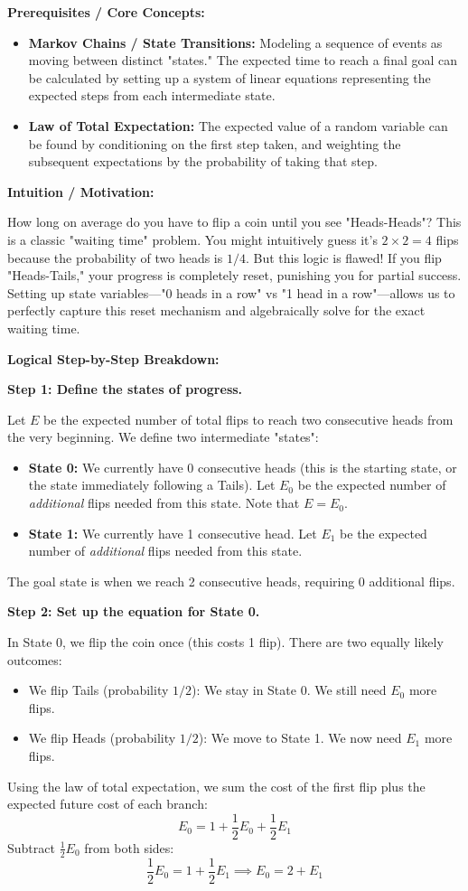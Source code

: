 \begin{solution}
\textbf{Prerequisites / Core Concepts:}
\begin{itemize}
    \item \textbf{Markov Chains / State Transitions:} Modeling a sequence of events as moving between distinct "states." The expected time to reach a final goal can be calculated by setting up a system of linear equations representing the expected steps from each intermediate state.
    \item \textbf{Law of Total Expectation:} The expected value of a random variable can be found by conditioning on the first step taken, and weighting the subsequent expectations by the probability of taking that step.
\end{itemize}

\textbf{Intuition / Motivation:}

How long on average do you have to flip a coin until you see "Heads-Heads"? This is a classic "waiting time" problem. You might intuitively guess it's $2 \times 2 = 4$ flips because the probability of two heads is $1/4$. But this logic is flawed! If you flip "Heads-Tails," your progress is completely reset, punishing you for partial success. Setting up state variables—"0 heads in a row" vs "1 head in a row"—allows us to perfectly capture this reset mechanism and algebraically solve for the exact waiting time.

\textbf{Logical Step-by-Step Breakdown:}

\textbf{Step 1: Define the states of progress.}

Let $E$ be the expected number of total flips to reach two consecutive heads from the very beginning. We define two intermediate "states":
\begin{itemize}
    \item \textbf{State 0:} We currently have 0 consecutive heads (this is the starting state, or the state immediately following a Tails). Let $E_0$ be the expected number of \textit{additional} flips needed from this state. Note that $E = E_0$.
    \item \textbf{State 1:} We currently have 1 consecutive head. Let $E_1$ be the expected number of \textit{additional} flips needed from this state.
\end{itemize}
The goal state is when we reach 2 consecutive heads, requiring 0 additional flips.

\textbf{Step 2: Set up the equation for State 0.}

In State 0, we flip the coin once (this costs 1 flip). There are two equally likely outcomes:
\begin{itemize}
    \item We flip Tails (probability $1/2$): We stay in State 0. We still need $E_0$ more flips.
    \item We flip Heads (probability $1/2$): We move to State 1. We now need $E_1$ more flips.
\end{itemize}
Using the law of total expectation, we sum the cost of the first flip plus the expected future cost of each branch:
\[ E_0 = 1 + \frac{1}{2} E_0 + \frac{1}{2} E_1 \]
Subtract $\frac{1}{2} E_0$ from both sides:
\[ \frac{1}{2} E_0 = 1 + \frac{1}{2} E_1 \implies E_0 = 2 + E_1 \]


\end{solution}
